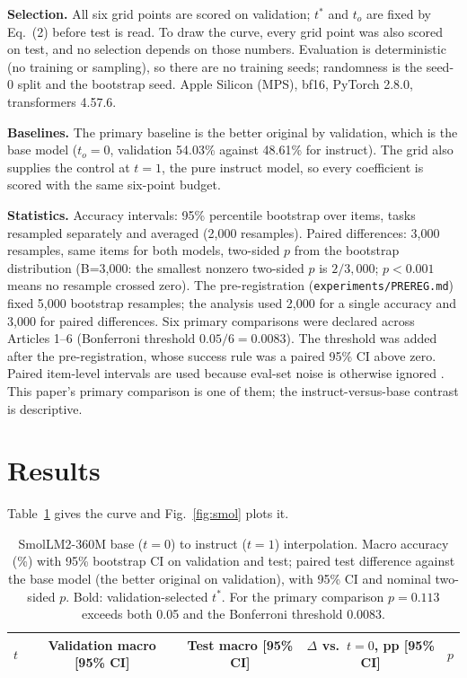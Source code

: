 \documentclass[conference]{IEEEtran}
\begin{document}
\textbf{Selection.} All six grid points are scored on validation; $t^\ast$ and $t_o$ are fixed by Eq.~(2) before test is read. To draw the curve, every grid point was also scored on test, and no selection depends on those numbers. Evaluation is deterministic (no training or sampling), so there are no training seeds; randomness is the seed-0 split and the bootstrap seed. Apple Silicon (MPS), bf16, PyTorch 2.8.0, transformers 4.57.6.

\textbf{Baselines.} The primary baseline is the better original by validation, which is the base model ($t_o=0$, validation 54.03\% against 48.61\% for instruct). The grid also supplies the control at $t=1$, the pure instruct model, so every coefficient is scored with the same six-point budget.

\textbf{Statistics.} Accuracy intervals: 95\% percentile bootstrap \cite{efron1979bootstrap} over items, tasks resampled separately and averaged (2{,}000 resamples). Paired differences: 3{,}000 resamples, same items for both models, two-sided $p$ from the bootstrap distribution (B=3,000: the smallest nonzero two-sided $p$ is $2/3{,}000$; $p<0.001$ means no resample crossed zero). The pre-registration (\texttt{experiments/PREREG.md}) fixed 5,000 bootstrap resamples; the analysis used 2,000 for a single accuracy and 3,000 for paired differences. Six primary comparisons were declared across Articles 1--6 (Bonferroni threshold $0.05/6=0.0083$). The threshold was added after the pre-registration, whose success rule was a paired 95\% CI above zero. Paired item-level intervals are used because eval-set noise is otherwise ignored \cite{miller2024errorbars}. This paper's primary comparison is one of them; the instruct-versus-base contrast is descriptive.

\section{Results}
Table~\ref{tab:smol} gives the curve and Fig.~\ref{fig:smol} plots it.

\begin{table}[!t]
\caption{SmolLM2-360M base ($t=0$) to instruct ($t=1$) interpolation. Macro accuracy (\%) with 95\% bootstrap CI on validation and test; paired test difference against the base model (the better original on validation), with 95\% CI and nominal two-sided $p$. Bold: validation-selected $t^\ast$. For the primary comparison $p=0.113$ exceeds both 0.05 and the Bonferroni threshold 0.0083.}
\label{tab:smol}
\centering
\small
\begin{tabular}{lcccc}
\toprule
$t$ & Validation macro [95\% CI] & Test macro [95\% CI] & $\Delta$ vs.\ $t=0$, pp [95\% CI] & $p$ \\
\midrule

\end{tabular}
\end{table}
\end{document}
